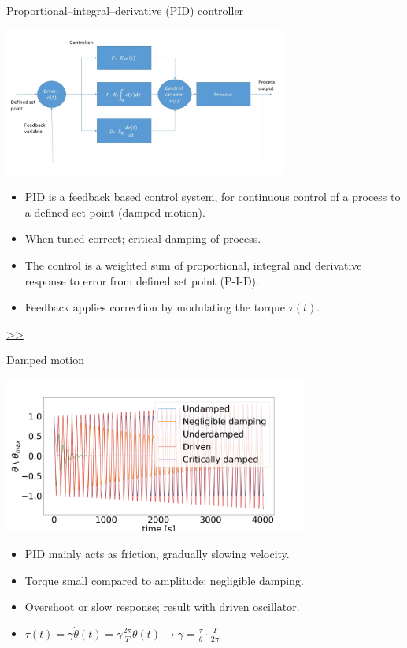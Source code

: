 \documentclass{beamer}
\begin{document}
\begin{frame}{\hypertarget{frame:Proportional–integral–derivative (PID) controller}{Proportional–integral–derivative (PID) controller}}
	\begin{center}		
		\includegraphics[width=0.7\textwidth,keepaspectratio]{pid_diagram_powerpoint.jpg}
    \end{center}
	\begin{itemize}	

		\item PID is a feedback based control system, for continuous control of a process to a defined set point (damped motion).
		\item When tuned correct; critical damping of process.
		\item The control is a weighted sum of proportional, integral and derivative response to error from defined set point (P-I-D).
		\item Feedback applies correction by modulating the torque $\tau(t)$.


	\end{itemize}
	\hyperlink{frame:Proportional–integral–derivative (PID) controller 1}{>>} 
\end{frame}


\begin{frame}{Damped motion}
	\begin{center}		
		\includegraphics[width=0.75\textwidth,keepaspectratio]{underdamp.png}
	\end{center}
	\begin{itemize}		
		\item PID mainly acts as friction, gradually slowing velocity.
		\item Torque small compared to amplitude; negligible damping. 
		\item Overshoot or slow response; result with driven oscillator.
		\item $\tau(t) =  \gamma\dot{\theta}(t) =  \gamma\frac{2\pi}{T} \theta( t) \rightarrow \gamma  =\frac{\tau}{\theta}\cdot \frac{ T}{2\pi} $
		
	\end{itemize}
\end{frame}
\end{document}
